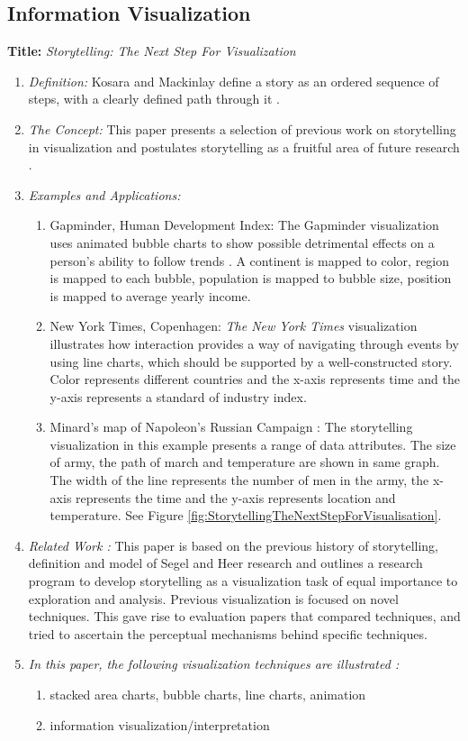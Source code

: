 \documentclass{egpubl}
\begin{document}
\subsection{Information Visualization}
\textbf{Title:} \textit{Storytelling: The Next Step For Visualization}
\begin{enumerate}
\item \textit{Definition:} Kosara and Mackinlay define a story as an ordered sequence of steps, with a clearly defined path through it \cite{Kosara}.
\item \textit{The Concept:} This paper presents a selection of previous work on storytelling in visualization and postulates storytelling as a fruitful area of future research \cite{Kosara}.
\item  \textit{Examples and Applications:} 
\begin{enumerate}
\item Gapminder, Human Development Index: The Gapminder visualization uses animated bubble charts to show possible detrimental effects on a person's ability to follow trends \cite{Rebortson}. A continent is mapped to color, region is mapped to each bubble, population is mapped to bubble size, position is mapped to average yearly income.
\item New York Times, Copenhagen: \textit{The New York Times} visualization illustrates how interaction provides a way of navigating through events by using line charts, which should be supported by a well-constructed story. Color represents different countries and the x-axis represents time and the y-axis represents a standard of industry index.
\item Minard's map of Napoleon's Russian Campaign : The storytelling visualization in this example presents a range of data attributes.  The size of army, the path of march and temperature are shown in same graph. The width of the line represents the number of men in the army, the x-axis represents the time and the y-axis represents location and temperature. See Figure \ref{fig:StorytellingTheNextStepForVisualisation}.
\end{enumerate}
\item \textit{Related Work :} This paper is based on  the previous history of storytelling, definition and model of Segel and Heer research \cite{segal} and outlines a research program to develop storytelling as a visualization task of equal importance to exploration and analysis. Previous visualization is focused on novel techniques. This gave rise to evaluation papers 
that compared techniques, and tried to ascertain the perceptual mechanisms behind specific techniques.
\item \textit{In this paper, the following visualization techniques are illustrated :} 
\begin{enumerate}
\item stacked area charts, bubble charts, line charts, animation
\item information visualization/interpretation
\end{enumerate}
\end{enumerate}
\end{document}
